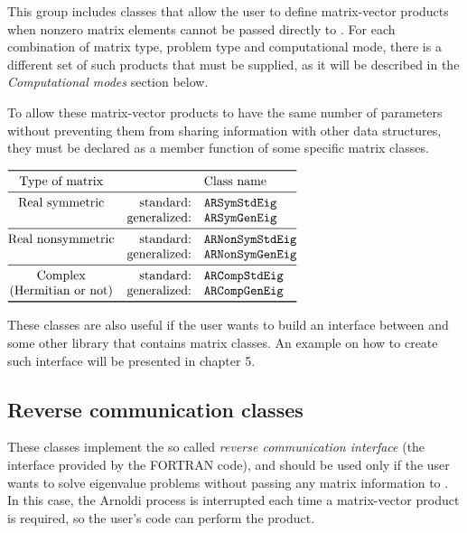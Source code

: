 This group includes classes that allow the user to define matrix-vector products when nonzero matrix elements cannot be passed directly to \ARPP{}. For each combination of matrix type, problem type and computational mode, there is a different set of such products that must be supplied, as it will be described in the \textit{Computational modes} section below.

To allow these matrix-vector products to have the same number of parameters without preventing them from sharing information with other data structures, they must be declared as a member function of some specific matrix classes.

\begin{center}
	\renewcommand{\arraystretch}{1.2}
	$\begin{array}{@{}crl@{}}\toprule
	\text{Type of matrix} & & \text{Class name} \\\midrule
	\text{Real symmetric} & \text{standard:} & \texttt{ARSymStdEig}\\
	& \text{generalized:} & \texttt{ARSymGenEig}\\\midrule
	\text{Real nonsymmetric} & \text{standard:} & \texttt{ARNonSymStdEig}\\
	& \text{generalized:} & \texttt{ARNonSymGenEig}\\\midrule
	\text{Complex} & \text{standard:} & \texttt{ARCompStdEig}\\
	\text{(Hermitian or not)} & \text{generalized:} & \texttt{ARCompGenEig}\\\bottomrule
	\end{array}$
\end{center}

These classes are also useful if the user wants to build an interface between \ARPP{} and some other library that contains matrix classes. An example on how to create such interface will be presented in chapter 5.

\subsection{Reverse communication classes}

These classes implement the so called \textit{reverse communication interface} (the interface provided by the \ARP{} FORTRAN code), and should be used only if the user wants to solve eigenvalue problems without passing any matrix information to \ARPP{}. In this case, the Arnoldi process is interrupted each time a matrix-vector product is required, so the user’s code can perform the product. 

